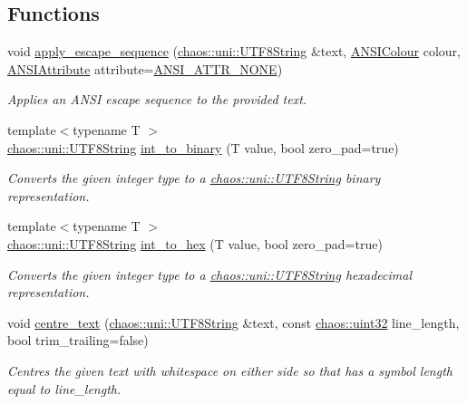 \subsection*{Functions}
\begin{DoxyCompactItemize}
\item 
void \hyperlink{namespacechaos_1_1io_1_1format_ae9aebf86c855cb5ed332902264a507b7}{apply\-\_\-escape\-\_\-sequence} (\hyperlink{classchaos_1_1uni_1_1_u_t_f8_string}{chaos\-::uni\-::\-U\-T\-F8\-String} \&text, \hyperlink{namespacechaos_1_1io_1_1format_aa30dcff2478ffc94e33504c8886a5b1a}{A\-N\-S\-I\-Colour} colour, \hyperlink{namespacechaos_1_1io_1_1format_af01119682ec0bc616b49641e0c2a7ccf}{A\-N\-S\-I\-Attribute} attribute=\hyperlink{namespacechaos_1_1io_1_1format_af01119682ec0bc616b49641e0c2a7ccfa3154b286513beb167bb516ea15f1cfb5}{A\-N\-S\-I\-\_\-\-A\-T\-T\-R\-\_\-\-N\-O\-N\-E})
\begin{DoxyCompactList}\small\item\em Applies an A\-N\-S\-I escape sequence to the provided text. \end{DoxyCompactList}\item 
{\footnotesize template$<$typename T $>$ }\\\hyperlink{classchaos_1_1uni_1_1_u_t_f8_string}{chaos\-::uni\-::\-U\-T\-F8\-String} \hyperlink{namespacechaos_1_1io_1_1format_a959b39b5d59d3cbbe277f214fe31c70a}{int\-\_\-to\-\_\-binary} (T value, bool zero\-\_\-pad=true)
\begin{DoxyCompactList}\small\item\em Converts the given integer type to a \hyperlink{classchaos_1_1uni_1_1_u_t_f8_string}{chaos\-::uni\-::\-U\-T\-F8\-String} binary representation. \end{DoxyCompactList}\item 
{\footnotesize template$<$typename T $>$ }\\\hyperlink{classchaos_1_1uni_1_1_u_t_f8_string}{chaos\-::uni\-::\-U\-T\-F8\-String} \hyperlink{namespacechaos_1_1io_1_1format_a1a0d0c026284787a225be9073770e264}{int\-\_\-to\-\_\-hex} (T value, bool zero\-\_\-pad=true)
\begin{DoxyCompactList}\small\item\em Converts the given integer type to a \hyperlink{classchaos_1_1uni_1_1_u_t_f8_string}{chaos\-::uni\-::\-U\-T\-F8\-String} hexadecimal representation. \end{DoxyCompactList}\item 
void \hyperlink{namespacechaos_1_1io_1_1format_ac53c87508bb81f6fc26efd9bfca7b027}{centre\-\_\-text} (\hyperlink{classchaos_1_1uni_1_1_u_t_f8_string}{chaos\-::uni\-::\-U\-T\-F8\-String} \&text, const \hyperlink{namespacechaos_a8641b3ae4551f0b35570d4f9f4ec22d9}{chaos\-::uint32} line\-\_\-length, bool trim\-\_\-trailing=false)
\begin{DoxyCompactList}\small\item\em Centres the given text with whitespace on either side so that has a symbol length equal to line\-\_\-length. \end{DoxyCompactList}\end{DoxyCompactItemize}


